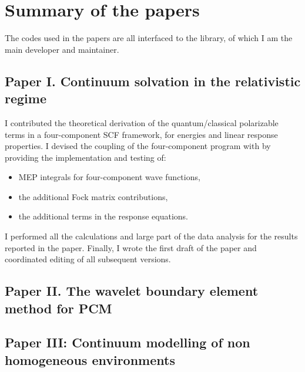 \chapter{Summary of the papers}\label{ch:papers-summary}

The codes used in the papers are all interfaced to the \pcmsolver library,
of which I am the main developer and maintainer.

\section{Paper I. Continuum solvation in the relativistic regime}

I contributed the theoretical derivation of the quantum/classical polarizable
terms in a four-component \acs{SCF} framework, for energies and linear response
properties. I devised the coupling of the four-component program \DIRAC with
\pcmsolver by providing the implementation and testing of:
\begin{itemize}
  \item \acs{MEP} integrals for four-component wave functions,
  \item the additional Fock matrix contributions,
  \item the additional terms in the response equations.
\end{itemize}
I performed all the calculations and large part of the data analysis
for the results reported in the paper.
Finally, I wrote the first draft of the paper and coordinated editing of
all subsequent versions.

\section{Paper II. The wavelet boundary element method for PCM}
\section{Paper III: Continuum modelling of non homogeneous environments}






